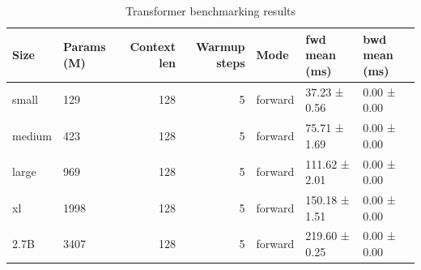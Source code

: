 \begin{table}
\caption{Transformer benchmarking results}
\label{tab:benchmarks}
\begin{tabular}{llrrlll}
\toprule
Size & Params (M) & Context len & Warmup steps & Mode & fwd mean (ms) & bwd mean (ms) \\
\midrule
small & 129 & 128 & 5 & forward & 37.23 ± 0.56 & 0.00 ± 0.00 \\
medium & 423 & 128 & 5 & forward & 75.71 ± 1.69 & 0.00 ± 0.00 \\
large & 969 & 128 & 5 & forward & 111.62 ± 2.01 & 0.00 ± 0.00 \\
xl & 1998 & 128 & 5 & forward & 150.18 ± 1.51 & 0.00 ± 0.00 \\
2.7B & 3407 & 128 & 5 & forward & 219.60 ± 0.25 & 0.00 ± 0.00 \\
\bottomrule
\end{tabular}
\end{table}
